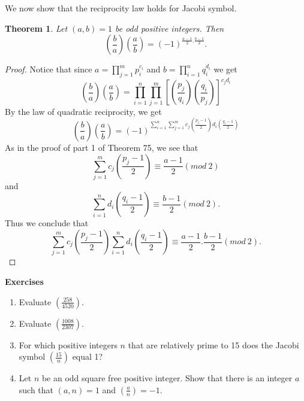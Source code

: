 \documentclass[12pt,letterpaper]{book}
\newtheorem{theorem}{Theorem}
\begin{document}
We now show that the reciprocity law holds for Jacobi symbol.

\begin{theorem}  Let $(a,b)=1$ be odd positive
integers.  Then
\begin{equation*}
\left(\frac{b}{a}\right)\left(\frac{a}{b}\right)=(-1)^{\frac{a-1}{2}.\frac{b-1}{2}}.
\end{equation*}
\end{theorem}

\begin{proof}
Notice that since $a=\prod_{j=1}^mp_i^{c_i}$ and
$b=\prod_{i=1}^nq_i^{d_i}$ we get
\begin{equation*}
\left(\frac{b}{a}\right)\left(\frac{a}{b}\right)=
\prod_{i=1}^n\prod_{j=1}^m\left[\left(\frac{p_j}{q_i}\right)\left(\frac{q_i}{p_j}\right)\right]^{c_jd_i}
\end{equation*}
By the law of quadratic reciprocity, we get
\begin{equation*}
\left(\frac{b}{a}\right)\left(\frac{a}{b}\right)=
(-1)^{\sum_{i=1}^n\sum_{j=1}^mc_j\left(\frac{p_j-1}{2}\right)d_i\left(\frac{q_i-1}{2}\right)}
\end{equation*}
As in the proof of part 1 of Theorem 75, we see that
\begin{equation*}
\sum_{j=1}^mc_j\left(\frac{p_j-1}{2}\right)\equiv \frac{a-1}{2}(mod
\ 2)
\end{equation*}
and
\begin{equation*}
\sum_{i=1}^nd_i\left(\frac{q_i-1}{2}\right)\equiv \frac{b-1}{2}(mod
\ 2).
\end{equation*}
Thus we conclude that
\begin{equation*}
\sum_{j=1}^mc_j\left(\frac{p_j-1}{2}\right)\sum_{i=1}^nd_i\left(\frac{q_i-1}{2}\right)\equiv
\frac{a-1}{2}.\frac{b-1}{2}(mod \ 2).
\end{equation*}
\end{proof}

\textbf{Exercises}
\begin{enumerate}
\item{Evaluate $\left(\frac{258}{4520}\right)$.}\item{Evaluate
$\left(\frac{1008}{2307}\right)$.}\item{For which positive integers
$n$ that are relatively prime to 15 does the Jacobi symbol
$\left(\frac{15}{n}\right)$ equal 1?}\item{Let $n$ be an odd square
free positive integer.  Show that there is an integer $a$ such that
$(a,n)=1$ and $\left(\frac{a}{n}\right)=-1$.}
\end{enumerate}
\end{document}
